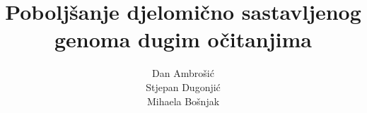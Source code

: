 \documentclass[lmodern, utf8, zavrsni, numeric]{fer}
\begin{document}
\title{ Poboljšanje djelomično sastavljenog genoma dugim očitanjima}

\author{Dan Ambrošić \\Stjepan Dugonjić \\Mihaela Bošnjak}

\maketitle


\tableofcontents








\end{document}
